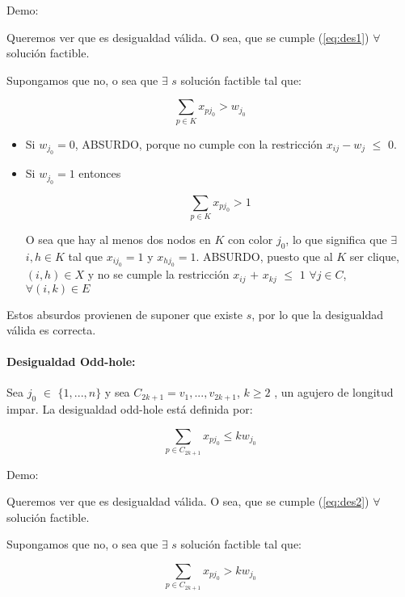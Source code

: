 \documentclass[a4paper]{article}
\begin{document}
Demo:

Queremos ver que es desigualdad válida. O sea, que se cumple (\ref{eq:des1}) $\forall$ solución factible.

Supongamos que no, o sea que $\exists$ $s$ solución factible tal que:

\begin{equation*}
\sum_{p \in K} x_{pj_0} > w_{j_0}
\end{equation*}

\begin{itemize}

	\item Si $w_{j_0} = 0$, ABSURDO, porque no cumple con la restricción $x_{ij} - w_j$ $\leq$ $0$.
	
	\item Si $w_{j_0} = 1$ entonces
	
	\begin{equation*}
	\sum_{p \in K} x_{pj_0} > 1
	\end{equation*}

	O sea que hay al menos dos nodos en $K$ con color $j_0$, lo que significa que $\exists$ $i,h \in K$ tal que $x_{ij_0} =1$ y $x_{hj_0} =1$.
	ABSURDO, puesto que al $K$ ser clique, $(i,h) \in X$ y no se cumple la restricción $x_{ij}$ $+$ $x_{kj}$ $\leq$ $1$   $\forall j \in C$, $\forall (i,k) \in E$
\end{itemize}

Estos absurdos provienen de suponer que existe $s$, por lo que la desigualdad válida es correcta.


\paragraph{Desigualdad Odd-hole:} Sea $j_0$ $\in$ $ \{ 1,...,n \} $ y sea $C_{2k+1} = v_1 ,..., v_{2k+1}$, $k \geq 2$ , un agujero de longitud impar. La desigualdad odd-hole está definida por:

\begin{equation} \label{eq:des2}
\sum_{p \in C_{2k+1}} x_{pj_0} \leq kw_{j_0}
\end{equation}

Demo:

Queremos ver que es desigualdad válida. O sea, que se cumple (\ref{eq:des2}) $\forall$ solución factible.

Supongamos que no, o sea que $\exists$ $s$ solución factible tal que:

\begin{equation*}
\sum_{p \in C_{2k+1}} x_{pj_0} > kw_{j_0}
\end{equation*}
\end{document}
